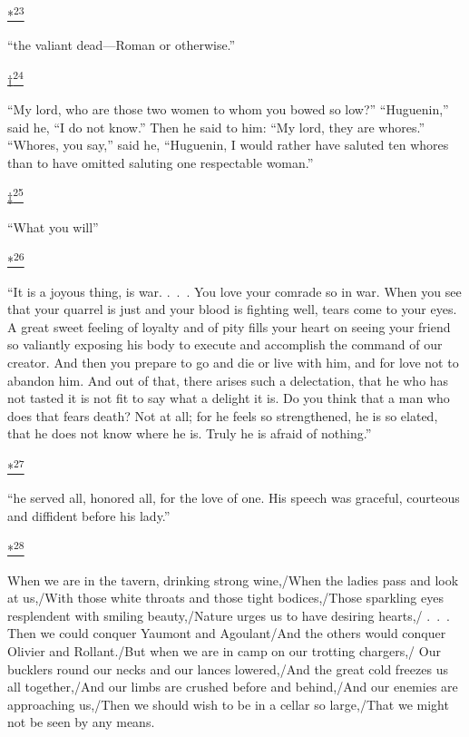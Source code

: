 \protect\hypertarget{23_NOTES.xhtmlux5cux23id_2508}{\protect\hyperlink{10_Chapter_Three__THE_HEROIC_DREAM.xhtmlux5cux23id_2507}{*\textsuperscript{23}}}
``the valiant dead---Roman or otherwise.''

\protect\hypertarget{23_NOTES.xhtmlux5cux23id_2510}{\protect\hyperlink{10_Chapter_Three__THE_HEROIC_DREAM.xhtmlux5cux23id_2509}{†\textsuperscript{24}}}
``My lord, who are those two women to whom you bowed so low?''
``Huguenin,'' said he, ``I do not know.'' Then he said to him: ``My
lord, they are whores.'' ``Whores, you say,'' said he, ``Huguenin, I
would rather have saluted ten whores than to have omitted saluting one
respectable woman.''

\protect\hypertarget{23_NOTES.xhtmlux5cux23id_2512}{\protect\hyperlink{10_Chapter_Three__THE_HEROIC_DREAM.xhtmlux5cux23id_2511}{‡\textsuperscript{25}}}
``What you will''

\protect\hypertarget{23_NOTES.xhtmlux5cux23id_2514}{\protect\hyperlink{10_Chapter_Three__THE_HEROIC_DREAM.xhtmlux5cux23id_2513}{*\textsuperscript{26}}}
``It is a joyous thing, is war. .~.~. You love your comrade so in war.
When you see that your quarrel is just and your blood is fighting well,
tears come to your eyes. A great sweet feeling of loyalty and of pity
fills your heart on seeing your friend so valiantly exposing his body to
execute and accomplish the command of our creator. And then you prepare
to go and die or live with him, and for love not to abandon him. And out
of that, there arises such a delectation, that he who has not tasted it
is not fit to say what a delight it is. Do you think that a man who does
that fears death? Not at all; for he feels so strengthened, he is so
elated, that he does not know where he is. Truly he is afraid of
nothing.''

\protect\hypertarget{23_NOTES.xhtmlux5cux23id_2516}{\protect\hyperlink{10_Chapter_Three__THE_HEROIC_DREAM.xhtmlux5cux23id_2515}{*\textsuperscript{27}}}
``he served all, honored all, for the love of one. His speech was
graceful, courteous and diffident before his lady.''

\protect\hypertarget{23_NOTES.xhtmlux5cux23id_2518}{\protect\hyperlink{10_Chapter_Three__THE_HEROIC_DREAM.xhtmlux5cux23id_2517}{*\textsuperscript{28}}}
When we are in the tavern, drinking strong wine,/When the ladies pass
and look at us,/With those white throats and those tight bodices,/Those
sparkling eyes resplendent with smiling beauty,/Nature urges us to have
desiring hearts,/ .~.~. Then we could conquer Yaumont and Agoulant/And
the others would conquer Olivier and Rollant./But when we are in camp on
our trotting chargers,/ Our bucklers round our necks and our lances
lowered,/And the great cold freezes us all together,/And our limbs are
crushed before and behind,/And our enemies are approaching us,/Then we
should wish to be in a cellar so large,/That we might not be seen by any
means.

